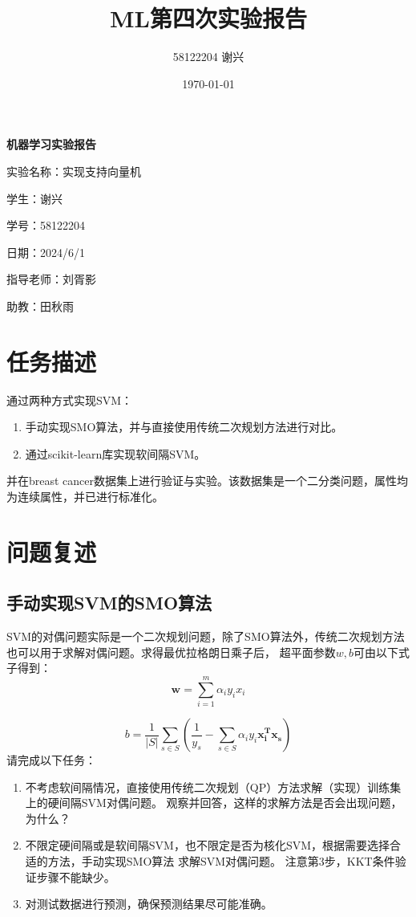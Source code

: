 \documentclass[12pt]{article}
\title{\textbf{ML第四次实验报告}}
\author{58122204 谢兴}
\date{\today}
\begin{document}
\begin{titlepage}
  \centering
  \vspace*{60pt}
  \Huge\textbf{机器学习实验报告}

  \vspace{100pt}
  \Large
  实验名称：实现支持向量机

  \vspace{25pt}
  学生：谢兴

  \vspace{25pt}
  学号：58122204

  \vspace{25pt}
  日期：2024/6/1

  \vspace{25pt}
  指导老师：刘胥影

  \vspace{25pt}
  助教：田秋雨



\end{titlepage}


\newpage
\tableofcontents


\section{任务描述}
通过两种方式实现SVM：
\begin{enumerate}
  \item 手动实现SMO算法，并与直接使用传统二次规划方法进行对比。
  \item 通过scikit-learn库实现软间隔SVM。
\end{enumerate}
并在breast cancer数据集上进行验证与实验。该数据集是一个二分类问题，属性均为连续属性，并已进行标准化。


\section{问题复述}
\subsection{手动实现SVM的SMO算法}
SVM的对偶问题实际是一个二次规划问题，除了SMO算法外，传统二次规划方法也可以用于求解对偶问题。求得最优拉格朗日乘子后，
超平面参数$w, b$可由以下式子得到：
\begin{equation}
  \textbf{w} = \sum_{i=1}^{m} \alpha_{i}y_{i}x_{i}
\end{equation}

\begin{equation}
  b=\frac{1}{|S|}\sum_{s\in S}(\frac{1}{y_{s}}-\sum_{s\in S}\alpha_{i}y_{i}\mathbf{x_{i}^{T}x_{s}})
\end{equation}
请完成以下任务：
\begin{enumerate}
  \item 不考虑软间隔情况，直接使用传统二次规划（QP）方法求解（实现）训练集上的硬间隔SVM对偶问题。
        观察并回答，这样的求解方法是否会出现问题，为什么？
  \item 不限定硬间隔或是软间隔SVM，也不限定是否为核化SVM，根据需要选择合适的方法，手动实现SMO算法 求解SVM对偶问题。
        注意第3步，KKT条件验证步骤不能缺少。
  \item 对测试数据进行预测，确保预测结果尽可能准确。
\end{enumerate}
\end{document}
